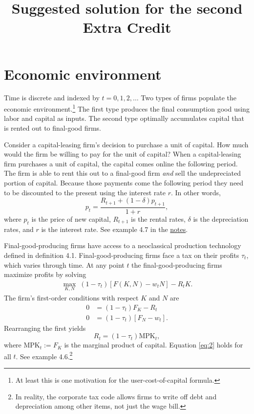 \documentclass[12pt]{pracjourn_rwr}
\title{Suggested solution for the second Extra Credit}
\theoremstyle{definition}
\theoremstyle{remark}
\begin{document}
\maketitle

\tableofcontents

\section{Economic environment}

Time is discrete and indexed by $t = 0,1,2,\dots$
Two types of firms populate the economic environment.\footnote{At least this is one motivation for the user-cost-of-capital formula.}
The first type produces the final consumption good using labor and capital as inputs.
The second type optimally accumulates capital that is rented out to final-good firms.

Consider a capital-leasing firm's decision to purchase a unit of capital.
How much would the firm be willing to pay for the unit of capital?
When a capital-leasing firm purchases a unit of capital, the capital comes online the following period.
The firm is able to rent this out to a final-good firm \emph{and} sell the undepreciated portion of capital.
Because those payments come the following period they need to be discounted to the present using the interest rate $r$.
In other words,
\begin{equation}
\label{eq:1}
p_{t} = \frac{R_{t+1} + (1-\delta)p_{t+1}}{1+r},
\end{equation}
where $p_{t}$ is the price of new capital, $R_{t+1}$ is the rental rates, $\delta$ is the depreciation rates, and
$r$ is the interest rate.
See example 4.7 in the \href{https://umich.app.box.com/s/dlnc24jda0xu9sqifl2uicc4cdmzit4l}{notes}.

Final-good-producing firms have access to a neoclassical production technology defined in definition 4.1.
Final-good-producing firms face a tax on their profits $\tau_{t}$, which varies through time.
At any point $t$ the final-good-producing firms maximize profits by solving
\begin{align*}
\max_{K,N} \; (1-\tau_{t}) \left[ F(K,N) - w_{t}N \right] - R_{t}K .
\end{align*}
The firm's first-order conditions with respect $K$ and $N$ are
\begin{align*}
0 &= (1-\tau_{t})F_{K} - R_{t} \\
0 &= (1-\tau_{t})\left[ F_{N} - w_{t} \right].
\end{align*}
Rearranging the first yields
\begin{equation}
\label{eq:2}
R_{t} = (1-\tau_{t}) \text{MPK}_{t},
\end{equation}
where $\text{MPK}_{t} := F_{K}$ is the marginal product of capital.
Equation \eqref{eq:2} holds for all $t$.
See example 4.6.\footnote{In reality, the corporate tax code allows firms to write off debt and depreciation among other items,
  not just the wage bill.}
\end{document}
